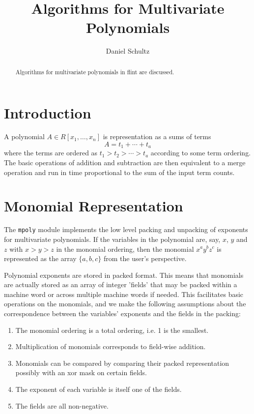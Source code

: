 \documentclass[11pt,reqno]{amsart}
\title{Algorithms for Multivariate Polynomials}
\author{Daniel Schultz}
\numberwithin{equation}{section}
\begin{document}
\begin{abstract}
Algorithms for multivariate polynomials in flint are discussed.
\end{abstract}


\maketitle

\section{Introduction}

A polynomial $A \in R[x_1,\dots,x_n]$ is representation as a sums of terms
\begin{equation*}
A = t_1 + \cdots + t_a
\end{equation*}
where the terms are ordered as $t_1 > t_2 > \cdots > t_a$ according to some
term ordering.
The basic operations of addition and subtraction are then equivalent to a merge
operation and run in time proportional to the sum of the input term counts.


\section{Monomial Representation}

The {\tt mpoly} module implements the low level packing and unpacking of
exponents
for multivariate polynomials. If the variables in the polynomial are, say,
$x$, $y$ and $z$ with $x > y > z$ in the monomial ordering, then the monomial
$x^a y^b z^c$ is represented as the array $\{a, b, c\}$ from the user's
perspective.

Polynomial exponents are stored in packed format. This means that monomials are
actually stored as an array of integer 'fields' that may be packed within
a machine word or across multiple machine words if needed.
This facilitates basic operations on the monomials, and we make the following
assumptions about the correspondence between the variables' exponents and the
fields in the packing:

\begin{enumerate}
\item {The monomial ordering is a total ordering, i.e. 1 is the smallest.}
\item{Multiplication of monomials corresponds to field-wise addition.}
\item{Monomials can be compared by comparing their packed representation possibly with an xor mask on certain fields.}
\item{The exponent of each variable is itself one of the fields.}
\item{The fields are all non-negative.}
\end{enumerate}
\end{document}
